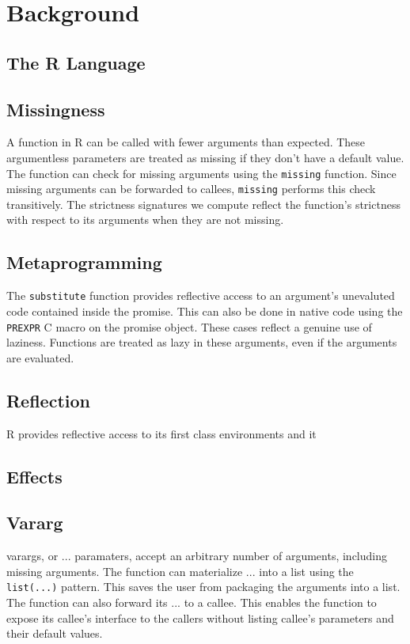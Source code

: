 \documentclass[review,nonacm,screen,acmsmall,anonymous=true]{acmart}
\newcommand{\code}[1]{\lstinline[style=R]|#1|\xspace}
\begin{document}
\section{Background}
\subsection{The R Language}

\subsection{Missingness}

A function in R can be called with fewer arguments than expected. These
argumentless parameters are treated as missing if they don't have a default
value. The function can check for missing arguments using the \code{missing}
function. Since missing arguments can be forwarded to callees, \code{missing}
performs this check transitively. The strictness signatures we compute reflect
the function's strictness with respect to its arguments when they are not
missing.


\subsection{Metaprogramming}
The \code{substitute} function provides reflective access to an argument's
unevaluted code contained inside the promise. This can also be done in native
code using the \code{PREXPR} C macro on the promise object. These cases reflect a
genuine use of laziness. Functions are treated as lazy in these arguments, even
if the arguments are evaluated.

\subsection{Reflection}
R provides reflective access to its first class environments and it

\subsection{Effects}

\subsection{Vararg}
varargs, or $...$ paramaters, accept an arbitrary number of arguments, including
missing arguments. The function can materialize $...$ into a list using the
\code{list(...)} pattern. This saves the user from packaging the arguments into
a list. The function can also forward its $...$ to a callee. This enables the
function to expose its callee's interface to the callers without listing
callee's parameters and their default values.
\end{document}

